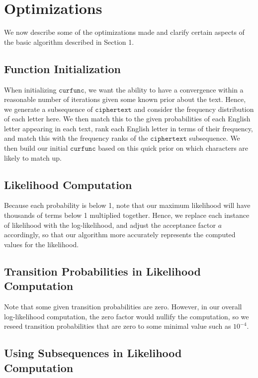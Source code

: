 \documentclass[11pt]{paper}
\numberwithin{equation}{section} %
\numberwithin{figure}{section} %
\numberwithin{table}{section} %
\begin{document}
\section{Optimizations}

We now describe some of the optimizations made and clarify certain aspects of the basic algorithm described in Section 1.

\subsection{Function Initialization}

When initializing $\texttt{curfunc}$, we want the ability to have a convergence within a reasonable number of iterations given some known prior about the text. Hence, we generate a subsequence of $\texttt{ciphertext}$ and consider the frequency distribution of each letter here. We then match this to the given probabilities of each English letter appearing in each text, rank each English letter in terms of their frequency, and match this with the frequency ranks of the $\texttt{ciphertext}$ subsequence. We then build our initial $\texttt{curfunc}$ based on this quick prior on which characters are likely to match up.

\subsection{Likelihood Computation}

Because each probability is below 1, note that our maximum likelihood will have thousands of terms below 1 multiplied together. Hence, we replace each instance of likelihood with the log-likelihood, and adjust the acceptance factor $a$ accordingly, so that our algorithm more accurately represents the computed values for the likelihood.

\subsection{Transition Probabilities in Likelihood Computation}

Note that some given transition probabilities are zero. However, in our overall log-likelihood computation, the zero factor would nullify the computation, so we reseed transition probabilities that are zero to some minimal value such as $10^{-4}$.

\subsection{Using Subsequences in Likelihood Computation}
\end{document}
